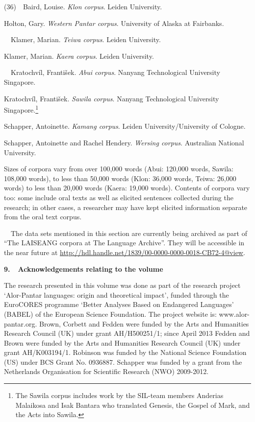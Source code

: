 (36)\ \ Baird, Louise. \textit{Klon corpus}. Leiden University.

Holton, Gary. \textit{Western Pantar corpus}. University of Alaska at Fairbanks.

\ \ Klamer, Marian. \textit{Teiwa corpus}. Leiden University.

Klamer, Marian. \textit{Kaera corpus}. Leiden University.

\ \ Kratochv\'il, Franti\v{s}ek. \textit{Abui corpus}. Nanyang Technological University Singapore.

Kratochv\'il, Franti\v{s}ek. \textit{Sawila corpus}. Nanyang Technological University Singapore.\footnote{The Sawila corpus includes work by the SIL-team members Anderias Malaikosa and Isak Bantara who translated Genesis, the Gospel of Mark, and the Acts into Sawila. }

Schapper, Antoinette. \textit{Kamang corpus}. Leiden University/University of Cologne.

Schapper, Antoinette and Rachel Hendery. \textit{Wersing corpus}. Australian National University.

Sizes of corpora vary from over 100,000 words (Abui: 120,000 words, Sawila: 108,000 words), to less than 50,000 words (Klon: 36,000 words, Teiwa: 26,000 words) to less than 20,000 words (Kaera: 19,000 words). Contents of corpora vary too: some include oral texts as well as elicited sentences collected during the research; in other cases, a researcher may have kept elicited information separate from the oral text corpus.

\ \ The data sets mentioned in this section are currently being archived as part of  {\textquotedblleft}The LAISEANG corpora at The Language Archive{\textquotedblright}. They will be accessible in the near future at \href{https://webmail.campus.leidenuniv.nl/owa/redir.aspx?C=VcF3tDaLq0iIlRczzT0ZXw_xD4uU3tAIZUYVDzSuO7QzFpu5wi759CTWognlXJNmDHNv_KzsnWc.&URL=http://hdl.handle.net/1839/00-0000-0000-0018-CB72-4@view}{http://hdl.handle.net/1839/00-0000-0000-0018-CB72-4@view}. 

{\bfseries
9.\ \ Acknowledgements relating to the volume }

The research presented in this volume was done as part of the research project {\textquoteleft}Alor-Pantar languages: origin and theoretical impact{\textquoteright}, funded through the EuroCORES programme {\textquoteleft}Better Analyses Based on Endangered Languages{\textquoteright} (BABEL) of the European Science Foundation. The project website is: www.alor-pantar.org. Brown, Corbett and Fedden were funded by the Arts and Humanities Research Council (UK) under grant AH/H500251/1; since April 2013 Fedden and Brown were funded by the Arts and Humanities Research Council (UK) under grant AH/K003194/1. Robinson was funded by the National Science Foundation (US) under BCS Grant No. 0936887. Schapper was funded by a grant from the Netherlands Organisation for Scientific Research (NWO) 2009-2012. 

